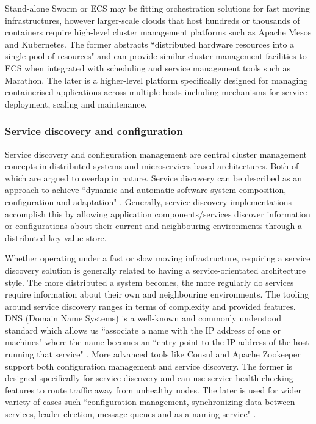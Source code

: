 \documentclass{report}
\begin{document}
\par
Stand-alone Swarm or ECS may be fitting orchestration solutions for fast moving infrastructures, however larger-scale clouds that host hundreds or thousands of containers require high-level cluster management platforms such as Apache Mesos and Kubernetes. The former abstracts ``distributed hardware resources into
a single pool of resources" and can provide similar cluster management facilities to ECS when integrated with scheduling and service management tools such as Marathon. The later is a higher-level platform specifically designed for managing containerised applications across multiple hosts including mechanisms for service deployment, scaling and maintenance.

\subsubsection{Service discovery and configuration}
Service discovery and configuration management are central cluster management concepts in distributed systems and microservices-based architectures. Both of which are argued to overlap in nature. Service discovery can be described as an approach to achieve ``dynamic and automatic software system composition, configuration and adaptation" \citep{Yang}. Generally, service discovery implementations accomplish this by allowing application components/services discover information or configurations about their current and  neighbouring environments through a distributed key-value store.
\par
Whether operating under a fast or slow moving infrastructure, requiring a service discovery solution is generally related to having a service-orientated  architecture style. The more distributed a system becomes, the more regularly do services require information about their own and neighbouring environments. The tooling around service discovery ranges in terms of complexity and provided features. DNS (Domain Name Systems) is a well-known and commonly understood standard which allows us ``associate a name with the IP address of one or machines" where the name becomes an ``entry point to the IP address of the host running that service" \citep{Newman}. More advanced tools like Consul and Apache Zookeeper support both configuration management and service discovery. The former is designed specifically for service discovery and can use service health checking features to route traffic away from unhealthy nodes. The later is used for wider variety of cases such ``configuration management, synchronizing data between services, leader election, message queues and as a naming service" \citep{Newman}.
\end{document}

